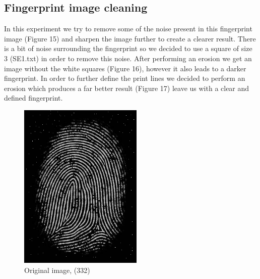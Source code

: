 \documentclass{article}
\begin{document}
\subsection{Fingerprint image cleaning}
\begin{flushleft}
In this experiment we try to remove some of the noise present in this fingerprint image (Figure 15) and sharpen the image further to create a clearer result. There is a bit of noise surrounding the fingerprint so we decided to use a square of size 3 (SE1.txt) in order to remove this noise. After performing an erosion we get an image without the white squares (Figure 16), however it also leads to a darker fingerprint. In order to further define the print lines we decided to perform an erosion which produces a far better result (Figure 17) leave us with a clear and defined fingerprint.
\end{flushleft}
\begin{figure}[H]
    \centering
    \includegraphics[height=8cm]{fingerprint.png}
    \caption{Original image, (332)}
    \label{fig:erosionSym}
\end{figure}
\end{document}
